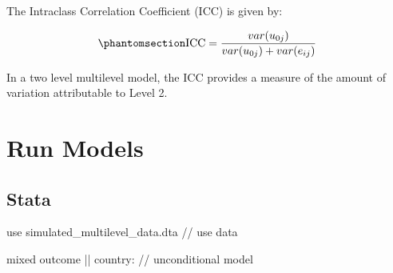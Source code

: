 \documentclass[
  letterpaper,
  DIV=11,
  numbers=noendperiod]{scrreprt}
\newenvironment{Shaded}{\begin{snugshade}}{\end{snugshade}}
\newcommand{\CommentTok}[1]{\textcolor[rgb]{0.37,0.37,0.37}{#1}}
\newcommand{\KeywordTok}[1]{\textcolor[rgb]{0.00,0.23,0.31}{#1}}
\newcommand{\NormalTok}[1]{\textcolor[rgb]{0.00,0.23,0.31}{#1}}
\begin{document}
The Intraclass Correlation Coefficient (ICC) is given by:

\begin{equation}\phantomsection\label{eq-ICCunconditional}{\text{ICC} = \frac{var(u_{0j})}{var(u_{0j}) + var(e_{ij})}}\end{equation}

In a two level multilevel model, the ICC provides a measure of the
amount of variation attributable to Level 2.

\section{Run Models}\label{run-models}

\subsection{Stata}

\begin{Shaded}
\begin{Highlighting}[]

\KeywordTok{use}\NormalTok{ simulated\_multilevel\_data.dta }\CommentTok{// use data}
\end{Highlighting}
\end{Shaded}

\begin{Shaded}
\begin{Highlighting}[]

\NormalTok{mixed outcome || country: }\CommentTok{// unconditional model}
  
\end{Highlighting}
\end{Shaded}
\end{document}

